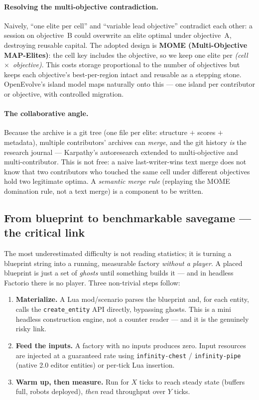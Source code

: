 \documentclass[11pt,a4paper]{article}
\begin{document}
\paragraph{Resolving the multi-objective contradiction.}
Naively, ``one elite per cell'' and ``variable lead objective'' contradict each
other: a session on objective~B could overwrite an elite optimal under
objective~A, destroying reusable capital. The adopted design is \textbf{MOME
(Multi-Objective MAP-Elites)}: the cell key includes the objective, so we keep
one elite per \emph{(cell~$\times$~objective)}. This costs storage proportional to
the number of objectives but keeps each objective's best-per-region intact and
reusable as a stepping stone. OpenEvolve's island model maps naturally onto this
--- one island per contributor or objective, with controlled migration.

\paragraph{The collaborative angle.}
Because the archive is a git tree (one file per elite: structure $+$ scores $+$
metadata), multiple contributors' archives can \emph{merge}, and the git history
\emph{is} the research journal --- Karpathy's autoresearch extended to
multi-objective and multi-contributor. This is not free: a naive last-writer-wins
text merge does not know that two contributors who touched the same cell under
different objectives hold two legitimate optima. A \emph{semantic merge rule}
(replaying the MOME domination rule, not a text merge) is a component to be
written.

\subsection{From blueprint to benchmarkable savegame --- the critical link}
\label{sec:method:materialize}

The most underestimated difficulty is not reading statistics; it is turning a
blueprint string into a running, measurable factory \emph{without a player}.
A placed blueprint is just a set of \emph{ghosts} until something builds it ---
and in headless Factorio there is no player. Three non-trivial steps follow:

\begin{enumerate}
\item \textbf{Materialize.} A Lua mod/scenario parses the blueprint and, for
  each entity, calls the \texttt{create\_entity} API directly, bypassing ghosts.
  This is a mini headless construction engine, not a counter reader --- and it is
  the genuinely risky link.
\item \textbf{Feed the inputs.} A factory with no inputs produces zero. Input
  resources are injected at a guaranteed rate using \texttt{infinity-chest} /
  \texttt{infinity-pipe} (native 2.0 editor entities) or per-tick Lua insertion.
\item \textbf{Warm up, then measure.} Run for $X$ ticks to reach steady state
  (buffers full, robots deployed), \emph{then} read throughput over $Y$ ticks.
\end{enumerate}
\end{document}
